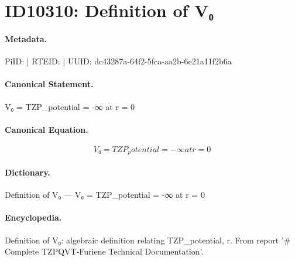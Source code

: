 \section*{ID10310: Definition of V₀}
\paragraph{Metadata.}
PiID:  | RTEID:  | UUID: dc43287a-64f2-5fca-aa2b-6e21a11f2b6a

\paragraph{Canonical Statement.}
V₀ = TZP\_potential = -∞ at r = 0

\paragraph{Canonical Equation.}
\[
V₀ = TZP_potential = -∞ at r = 0
\]

\paragraph{Dictionary.}
Definition of V₀ — V₀ = TZP\_potential = -∞ at r = 0

\paragraph{Encyclopedia.}
Definition of V₀: algebraic definition relating TZP\_potential, r. From report '\# Complete TZPQVT-Furiene Technical Documentation'.

